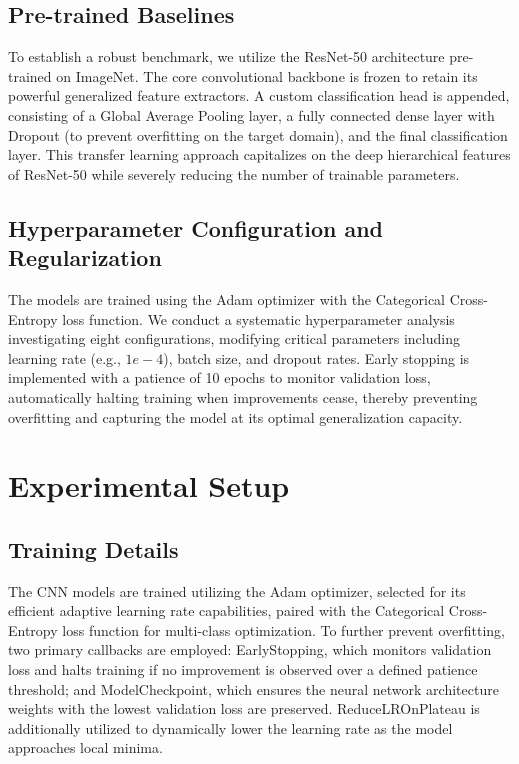 \documentclass[conference]{IEEEtran}
\begin{document}
\subsection{Pre-trained Baselines}
To establish a robust benchmark, we utilize the ResNet-50 architecture pre-trained on ImageNet. The core convolutional backbone is frozen to retain its powerful generalized feature extractors. A custom classification head is appended, consisting of a Global Average Pooling layer, a fully connected dense layer with Dropout (to prevent overfitting on the target domain), and the final classification layer. This transfer learning approach capitalizes on the deep hierarchical features of ResNet-50 while severely reducing the number of trainable parameters.

\subsection{Hyperparameter Configuration and Regularization}
The models are trained using the Adam optimizer with the Categorical Cross-Entropy loss function. We conduct a systematic hyperparameter analysis investigating eight configurations, modifying critical parameters including learning rate (e.g., $1e-4$), batch size, and dropout rates. Early stopping is implemented with a patience of 10 epochs to monitor validation loss, automatically halting training when improvements cease, thereby preventing overfitting and capturing the model at its optimal generalization capacity.

\section{Experimental Setup}

\subsection{Training Details}
The CNN models are trained utilizing the Adam optimizer, selected for its efficient adaptive learning rate capabilities, paired with the Categorical Cross-Entropy loss function for multi-class optimization. To further prevent overfitting, two primary callbacks are employed: EarlyStopping, which monitors validation loss and halts training if no improvement is observed over a defined patience threshold; and ModelCheckpoint, which ensures the neural network architecture weights with the lowest validation loss are preserved. ReduceLROnPlateau is additionally utilized to dynamically lower the learning rate as the model approaches local minima.
\end{document}
